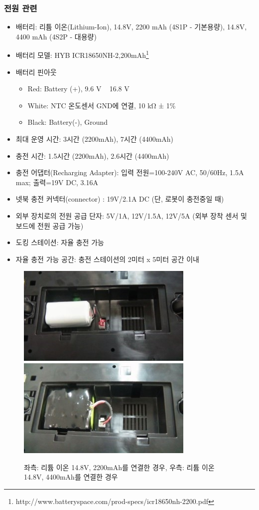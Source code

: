 \subsubsection{전원 관련}

\begin{itemize}[leftmargin=*]
\item 배터리: 리튬 이온(Lithium-Ion), 14.8V, 2200 mAh (4S1P - 기본용량), 14.8V, 4400 mAh (4S2P - 대용량)
\item 배터리 모델: HYB ICR18650NH-2,200mAh\footnote{http://www.batteryspace.com/prod-specs/icr18650nh-2200.pdf}
\item 배터리 핀아웃
  \begin{itemize}
  \item Red: Battery (+), 9.6 V ~ 16.8 V
  \item White: NTC 온도센서 GND에 연결, 10 kΩ ± 1\%
  \item Black: Battery(-), Ground
  \end{itemize}
\item 최대 운영 시간: 3시간 (2200mAh), 7시간 (4400mAh)
\item 충전 시간: 1.5시간 (2200mAh), 2.6시간 (4400mAh)
\item 충전 어댑터(Recharging Adapter): 입력 전원=100-240V AC, 50/60Hz, 1.5A max; 출력=19V DC, 3.16A
\item 넷북 충전 커넥터(connector) : 19V/2.1A DC (단, 로봇이 충전중일 때)
\item 외부 장치로의 전원 공급 단자: 5V/1A, 12V/1.5A, 12V/5A (외부 장착 센서 및 보드에 전원 공급 가능)
\item 도킹 스테이션: 자율 충전 가능
\item 자율 충전 가능 공간: 충전 스테이션의 2미터 x 5미터 공간 이내
\end{itemize}

\begin{figure}[h]
\centering
\includegraphics[width=0.4\columnwidth]{pictures/chapter10/battery1.jpg}
\includegraphics[width=0.4\columnwidth]{pictures/chapter10/battery2.jpg}
\caption{좌측: 리튬 이온 14.8V, 2200mAh를 연결한 경우, 우측: 리튬 이온 14.8V, 4400mAh를 연결한 경우}
\end{figure}

